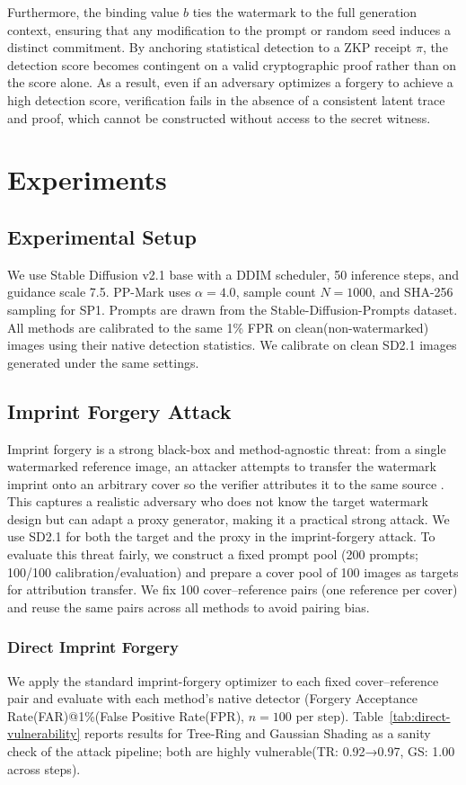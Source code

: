 \documentclass{article}
\theoremstyle{plain}
\theoremstyle{definition}
\theoremstyle{remark}
\begin{document}
Furthermore, the binding value \(b\) ties the watermark to the full generation context,
ensuring that any modification to the prompt or random seed induces a distinct
commitment. By anchoring statistical detection to a ZKP receipt \(\pi\), the detection
score becomes contingent on a valid cryptographic proof rather than on the score alone.
As a result, even if an adversary optimizes a forgery to achieve a high detection score,
verification fails in the absence of a consistent latent trace and proof, which cannot be
constructed without access to the secret witness.

\section{Experiments}
\subsection{Experimental Setup}
We use Stable Diffusion v2.1 base with a DDIM scheduler, 50 inference steps, and guidance scale 7.5. PP-Mark uses $\alpha=4.0$, sample count $N=1000$, and SHA-256 sampling for SP1. Prompts are drawn from the Stable-Diffusion-Prompts dataset. All methods are calibrated to the same 1\% FPR on clean(non-watermarked) images using their native detection statistics. We calibrate on clean SD2.1 images generated under the same settings.

\subsection{Imprint Forgery Attack}
Imprint forgery is a strong black-box and method-agnostic threat: from a
single watermarked reference image, an attacker attempts to transfer the watermark imprint onto an arbitrary cover so the verifier attributes it to the same source
\cite{muller2025blackbox}. This captures a realistic adversary who does not know the target watermark design but can adapt a proxy generator, making it a practical strong attack. We use SD2.1 for both the target and the proxy in the imprint-forgery attack. To evaluate this threat fairly, we construct a fixed prompt pool (200 prompts; 100/100 calibration/evaluation) and prepare a cover pool of 100 images as targets for attribution transfer. We fix 100 cover–reference pairs (one reference per cover) and reuse the same pairs across all methods to avoid pairing bias.

\subsubsection{Direct Imprint Forgery}
We apply the standard imprint-forgery optimizer to each fixed cover--reference pair and evaluate with each method’s native detector (Forgery Acceptance Rate(FAR)@1\%(False Positive Rate(FPR), $n=100$ per step).
Table~\ref{tab:direct-vulnerability} reports results for Tree-Ring and Gaussian Shading as a sanity check of the attack pipeline; both are highly vulnerable(TR: 0.92→0.97, GS: 1.00 across steps).
\end{document}
